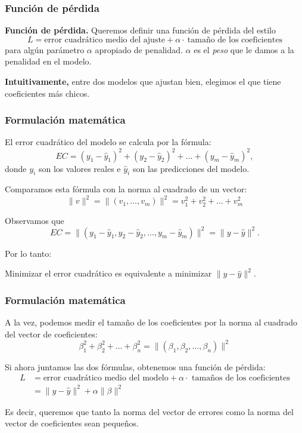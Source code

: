 \documentclass[aspectratio=169,12pt]{beamer}
\begin{document}
\begin{frame}
\frametitle{Función de pérdida}

\textbf{Función de pérdida.} Queremos definir una función de pérdida del estilo
$$L = \text{error cuadrático medio del ajuste} + \alpha \cdot \ \text{tamaño de los coeficientes}$$
para algún parámetro $\alpha$ apropiado de penalidad. $\alpha$ es el \emph{peso} que le damos a la penalidad en el modelo.

\textbf{Intuitivamente,} entre dos modelos que ajustan bien, elegimos el que tiene coeficientes más chicos.
\end{frame}

\begin{frame}
\frametitle{Formulación matemática}

El error cuadrático del modelo se calcula por la fórmula:
$$
EC = (y_1 - \hat y_1)^2 + (y_2 - \hat y_2)^2 + \dots + (y_m - \hat y_m)^2,
$$
donde $y_i$ son los valores reales e $\hat y_i$ son las predicciones del modelo.

Comparamos esta fórmula con la norma al cuadrado  de un vector:
$$
\|v\|^2 = \|(v_1, \dots, v_m)\|^2 = v_1^2 + v_2^2 + \dots + v_m^2
$$

Observamos que 
$$EC = \|(y_1 - \hat y_1, y_2 - \hat y_2, \dots, y_m - \hat y_m)\|^2 = \|y - \hat y\|^2.$$

Por lo tanto:
\begin{block}{}
\centering
Minimizar el error cuadrático es equivalente a minimizar $\|y - \hat y\|^2$.
\end{block}

\end{frame}

\begin{frame}
\frametitle{Formulación matemática}

A la vez, podemos medir el tamaño de los coeficientes por la norma al cuadrado del vector de coeficientes:
$$
\beta_1^2 + \beta_2^2 + \dots + \beta_n^2 = \|(\beta_1, \beta_2, \dots, \beta_n)\|^2
$$

Si ahora juntamos las dos fórmulas, obtenemos una función de pérdida:
\begin{align*}
L &= \text{error cuadrático medio del modelo} + \alpha \cdot \text{ tamaños de los coeficientes} \\
&= \|y - \hat y\|^2 + \alpha \|\beta\|^2
\end{align*}

Es decir, queremos que tanto la norma del vector de errores como la norma del vector de coeficientes sean pequeños.
\end{frame}
\end{document}

